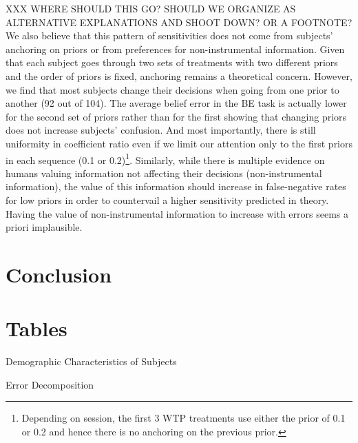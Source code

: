 \documentclass[12pt,a4paper]{article}
\newcommand{\agt}[1]{{\color{OliveGreen}#1}}
\begin{document}
\agt{XXX WHERE SHOULD THIS GO? SHOULD WE ORGANIZE AS ALTERNATIVE EXPLANATIONS AND SHOOT DOWN? OR A FOOTNOTE?}We also believe that this pattern of sensitivities does not come from subjects' anchoring on priors or from preferences for non-instrumental information. Given that each subject goes through two sets of treatments with two different priors and the order of priors is fixed, anchoring remains a theoretical concern. However, we find that most subjects change their decisions when going from one prior to another (92 out of 104). The average belief error in the BE task is actually lower for the second set of priors rather than for the first showing that changing priors does not increase subjects' confusion. And most importantly, there is still uniformity in coefficient ratio even if we limit our attention only to the first priors in each sequence (0.1 or 0.2)\footnote{Depending on session, the first 3 WTP treatments use either the prior of 0.1 or 0.2 and hence there is no anchoring on the previous prior.}.  Similarly, while there is multiple evidence on humans valuing information not affecting their decisions (non-instrumental information), the value of this information should increase in false-negative rates for low priors in order to countervail a higher sensitivity predicted in theory. Having the value of non-instrumental information to increase with errors seems a priori implausible.

 

\vspace{20pt}

\section{Conclusion}


\clearpage





\appendix

\newpage
\section{Tables}


\begin{table}[h!]
\caption{Demographic Characteristics of Subjects} \label{summ_tab}

\end{table}

\begin{table}[h!]
\caption{Error Decomposition} \label{belief_decomposition}

\end{table}
\end{document}
